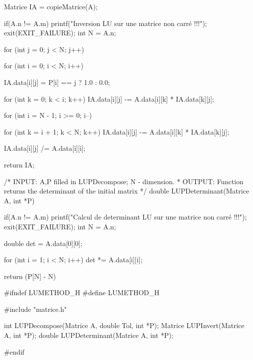 \documentclass[12pt]{article}
\begin{document}
\begin{C}
{    Matrice IA = copieMatrice(A);
    
    if(A.n != A.m)
    {
        printf("Inversion LU sur une matrice non carré !!!\n");
        exit(EXIT_FAILURE);
    }
    int N = A.n;
  
    for (int j = 0; j < N; j++) {
        for (int i = 0; i < N; i++) {
            IA.data[i][j] = P[i] == j ? 1.0 : 0.0;

            for (int k = 0; k < i; k++)
                IA.data[i][j] -= A.data[i][k] * IA.data[k][j];
        }

        for (int i = N - 1; i >= 0; i--) {
            for (int k = i + 1; k < N; k++)
                IA.data[i][j] -= A.data[i][k] * IA.data[k][j];

            IA.data[i][j] /= A.data[i][i];
        }
    }
    
    return IA;
}

/* INPUT: A,P filled in LUPDecompose; N - dimension.
 * OUTPUT: Function returns the determinant of the initial matrix
 */
double LUPDeterminant(Matrice A, int *P) {
    
    if(A.n != A.m)
    {
        printf("Calcul de determinant LU sur une matrice non carré !!!\n");
        exit(EXIT_FAILURE);
    }
    int N = A.n;

    double det = A.data[0][0];

    for (int i = 1; i < N; i++)
        det *= A.data[i][i];

    return (P[N] - N) %
}
\end{C}

\begin{C}
#ifndef LUMETHOD_H
#define LUMETHOD_H

#include "matrice.h"

int LUPDecompose(Matrice A, double Tol, int *P);
Matrice LUPInvert(Matrice A, int *P);
double LUPDeterminant(Matrice A, int *P);

#endif
\end{C}
\end{document}
